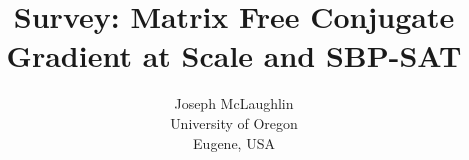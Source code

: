 \title{Survey: Matrix Free Conjugate Gradient at Scale and SBP-SAT}
\author{Joseph McLaughlin \\
        University of Oregon \\ 
        Eugene, USA}